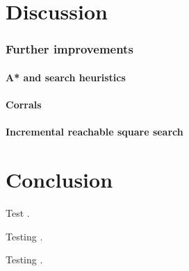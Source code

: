 \documentclass[a4paper,11pt]{article}
\renewcommand{\*}[0]{\cdot}
\begin{document}
\part*{Discussion}

\section{Further improvements}

\subsection{A* and search heuristics}

\subsection{Corrals}

\subsection{Incremental reachable square search}

\part*{Conclusion}





Test \cite{culberson1997}.

Testing \cite{russell2009}.

Testing \cite{takes2007}.
\end{document}
